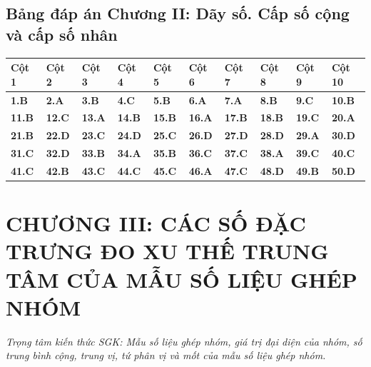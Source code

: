 \documentclass[11pt,a4paper]{article}
\begin{document}
\subsection*{\color{primary} Bảng đáp án Chương II: Dãy số. Cấp số cộng và cấp số nhân}
\begin{center}
\renewcommand{\arraystretch}{1.25}
\begin{tabularx}{\textwidth}{*{10}{>{\centering\arraybackslash}X}}
\toprule
\textbf{\color{primary} Cột 1} & \textbf{\color{primary} Cột 2} & \textbf{\color{primary} Cột 3} & \textbf{\color{primary} Cột 4} & \textbf{\color{primary} Cột 5} & \textbf{\color{primary} Cột 6} & \textbf{\color{primary} Cột 7} & \textbf{\color{primary} Cột 8} & \textbf{\color{primary} Cột 9} & \textbf{\color{primary} Cột 10} \\
\midrule
\textbf{1.B} & \textbf{2.A} & \textbf{3.B} & \textbf{4.C} & \textbf{5.B} & \textbf{6.A} & \textbf{7.A} & \textbf{8.B} & \textbf{9.C} & \textbf{10.B} \\
\rowcolor{rowtint} \textbf{11.B} & \textbf{12.C} & \textbf{13.A} & \textbf{14.B} & \textbf{15.B} & \textbf{16.A} & \textbf{17.B} & \textbf{18.B} & \textbf{19.C} & \textbf{20.A} \\
\textbf{21.B} & \textbf{22.D} & \textbf{23.C} & \textbf{24.D} & \textbf{25.C} & \textbf{26.D} & \textbf{27.D} & \textbf{28.D} & \textbf{29.A} & \textbf{30.D} \\
\rowcolor{rowtint} \textbf{31.C} & \textbf{32.D} & \textbf{33.B} & \textbf{34.A} & \textbf{35.B} & \textbf{36.C} & \textbf{37.C} & \textbf{38.A} & \textbf{39.C} & \textbf{40.C} \\
\textbf{41.C} & \textbf{42.B} & \textbf{43.C} & \textbf{44.C} & \textbf{45.C} & \textbf{46.A} & \textbf{47.C} & \textbf{48.D} & \textbf{49.B} & \textbf{50.D} \\
\bottomrule
\end{tabularx}
\end{center}\vspace{10pt}
\section*{\color{primary} CHƯƠNG III: CÁC SỐ ĐẶC TRƯNG ĐO XU THẾ TRUNG TÂM CỦA MẪU SỐ LIỆU GHÉP NHÓM}
\textit{Trọng tâm kiến thức SGK: Mẫu số liệu ghép nhóm, giá trị đại diện của nhóm, số trung bình cộng, trung vị, tứ phân vị và mốt của mẫu số liệu ghép nhóm.}\par\vspace{4pt}
\end{document}
